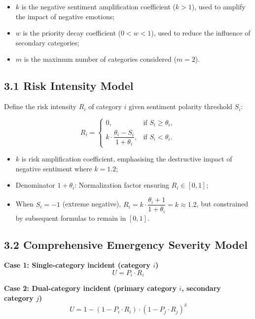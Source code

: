 \documentclass{article}
\numberwithin{equation}{section}
\begin{document}
\begin{itemize}

    \item $ k $ is the negative sentiment amplification coefficient ($ k > 1 $), used to amplify the impact of negative emotions;
    
    \item $ w $ is the priority decay coefficient ($ 0 < w < 1 $), used to reduce the influence of secondary categories;
    
    \item $ m $ is the maximum number of categories considered ($ m = 2 $).
\end{itemize}

\subsection*{3.1 Risk Intensity Model}

Define the risk intensity $ R_i $ of category $ i $ given sentiment polarity threshold $ S_i $:

\[
R_i = 
\begin{cases} 
0, & \text{if } S_i \geq \theta_i, \\
k \cdot \dfrac{\theta_i - S_i}{1 + \theta_i}, & \text{if } S_i < \theta_i.
\end{cases}
\]

\begin{itemize}
    \item $k$ is risk amplification coefficient, emphasising the destructive impact of negative sentiment where $ k = 1.2 $; 
    \item Denominator $ 1 + \theta_i $: Normalization factor ensuring $ R_i \in [0,1] $;
    \item When $ S_i = -1 $ (extreme negative), $ R_i = k \cdot \dfrac{\theta_i + 1}{1 + \theta_i} = k \approx 1.2 $, but constrained by subsequent formulas to remain in $[0,1]$.
\end{itemize}


\subsection*{3.2 Comprehensive Emergency Severity Model}

\textbf{Case 1: Single-category incident (category $ i $)}
\[
U = P_i \cdot R_i
\]

\textbf{Case 2: Dual-category incident (primary category $ i $, secondary category $ j $)}
\[
U = 1 - (1 - P_i \cdot R_i) \cdot (1 - P_j \cdot R_j)^{\delta}
\]
\end{document}
